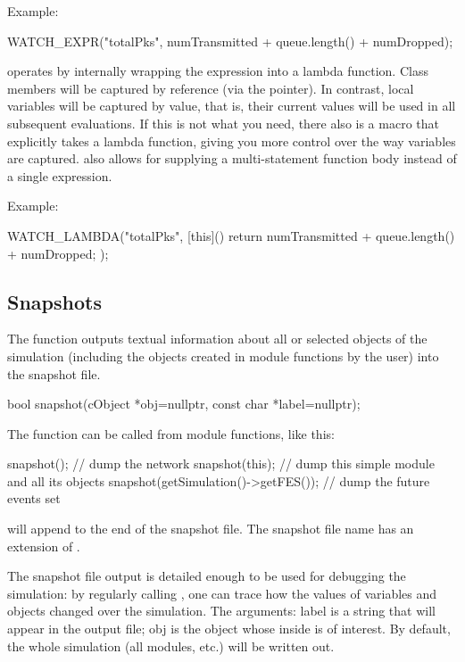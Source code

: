 Example:

\begin{cpp}
WATCH_EXPR("totalPks", numTransmitted + queue.length() + numDropped);
\end{cpp}

 operates by internally wrapping the expression into a
lambda function. Class members will be captured by reference (via the 
pointer). In contrast, local variables will be captured by value, that is, their
current values will be used in all subsequent evaluations. If this is not
what you need, there also is a  macro that explicitly takes a
lambda function, giving you more control over the way variables are captured.
 also allows for supplying a multi-statement function body
instead of a single expression.

Example:

\begin{cpp}
WATCH_LAMBDA("totalPks", [this]() {
     return numTransmitted + queue.length() + numDropped;
});
\end{cpp}

\subsection{Snapshots}
\label{sec:sim-lib:snapshots}

The  function outputs textual information about all
or selected objects of the simulation (including the objects created
in module functions by the user) into the snapshot file.

\begin{cpp}
bool snapshot(cObject *obj=nullptr, const char *label=nullptr);
\end{cpp}

The function can be called from module functions, like this:

\begin{cpp}
snapshot();     // dump the network
snapshot(this); // dump this simple module and all its objects
snapshot(getSimulation()->getFES()); // dump the future events set
\end{cpp}

 will append to the end of the snapshot file. The snapshot
file name has an extension of .

The snapshot file output is detailed enough to be used for debugging
the simulation: by regularly calling , one can trace
how the values of variables and objects changed over the simulation.
The arguments: label is a string that will appear in the output
file; obj is the object whose inside is of interest. By default,
the whole simulation (all modules, etc.) will be written out.

